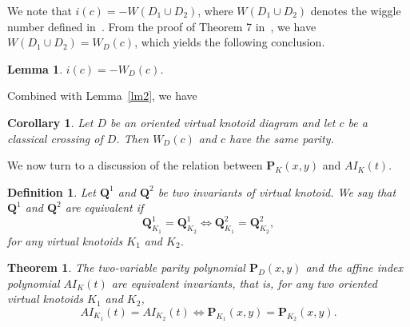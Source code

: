 \documentclass[10pt,a4paper]{amsart}
\newtheorem{theorem}{Theorem}[section]
\newtheorem{corollary}{Corollary}[section]
\newtheorem{lemma}{Lemma}[section]
\newtheorem{definition}{Definition}[section]
\numberwithin{equation}{section}
\numberwithin{equation}{section}
\begin{document}
We note that $i(c) = -W(D_1\cup D_2)$, where $W(D_1\cup D_2)$ denotes the wiggle number defined in~\cite{FK}. From the proof of Theorem 7 in~\cite{FK}, we have $W(D_1\cup D_2)=W_D(c)$, which yields the following conclusion.

\begin{lemma}
	$i(c)=-W_D(c)$. \label{lm1}
\end{lemma}

Combined with Lemma~\ref{lm2}, we have

\begin{corollary} \label{cor:weight-parity}
	Let $D$ be an oriented virtual knotoid diagram and let $c$ be a classical crossing of $D$.	Then $W_D(c)$ and $c$ have the same parity.
\end{corollary}

We now turn to a discussion of the relation between $\mathbf{P}_K(x,y)$ and $AI_K(t)$.

\begin{definition}
	Let $\mathbf{Q}^1$ and $\mathbf{Q}^2$ be two invariants of virtual knotoid. We say that $\mathbf{Q}^1$ and $\mathbf{Q}^2$ are equivalent if $$\mathbf{Q}^1_{K_1}=\mathbf{Q}^1_{K_2} \iff \mathbf{Q}^2_{K_1}=\mathbf{Q}^2_{K_2},$$ for any virtual knotoids $K_1$ and $K_2$.
\end{definition}


\begin{theorem}\label{thm2} 
	The two-variable parity polynomial $\mathbf{P}_D(x,y)$ and the affine index polynomial $AI_K(t)$ are equivalent invariants, that is, for any two oriented virtual knotoids $K_1$ and $K_2$,
	$$
	AI_{K_1}(t)=AI_{K_2}(t)
	\iff
	\mathbf P_{K_1}(x,y)=
	\mathbf P_{K_2}(x,y).
	$$
\end{theorem}
\end{document}
